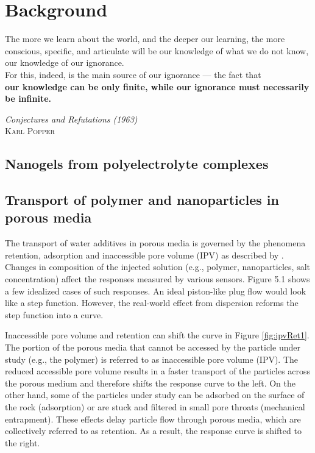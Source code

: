 \chapter{Background} \label{chap:background}
\vspace*{\fill}
\epigraph{The more we learn about the world, and the deeper our learning, the more conscious, specific, and articulate will be our knowledge of what we do not know, our knowledge of our ignorance.\\ For this, indeed, is the main source of our ignorance — the fact that\\ \textbf{our knowledge can be only finite, while our ignorance must necessarily be infinite.}}%
{\textit{Conjectures and Refutations (1963)}\\ \textsc{Karl Popper}}
\clearpage{\thispagestyle{empty}\cleardoublepage}
\section{Nanogels from polyelectrolyte complexes}


\section{Transport of polymer and nanoparticles in porous media}
The transport of water additives in porous media is governed by the phenomena retention, adsorption and inaccessible pore volume (IPV) as described by \citep{Lotsch1985}. Changes in composition of the injected solution (e.g., polymer, nanoparticles, salt concentration) affect the responses measured by various sensors. Figure 5.1 shows a few idealized cases of such responses. An ideal piston-like plug flow would look like a step function. However, the real-world effect from dispersion reforms the step function into a curve.

Inaccessible pore volume and retention can shift the curve in Figure \ref{fig:ipvRet1}. The portion of the porous media that cannot be accessed by the particle under study (e.g., the polymer) is referred to as inaccessible pore volume (IPV). The reduced accessible pore volume results in a faster transport of the particles across the porous medium and therefore shifts the response curve to the left. On the other hand, some of the particles under study can be adsorbed on the surface of the rock (adsorption) or are stuck and filtered in small pore throats (mechanical entrapment). These effects delay particle flow through porous media, which are collectively referred to as retention. As a result, the response curve is shifted to the right. 


